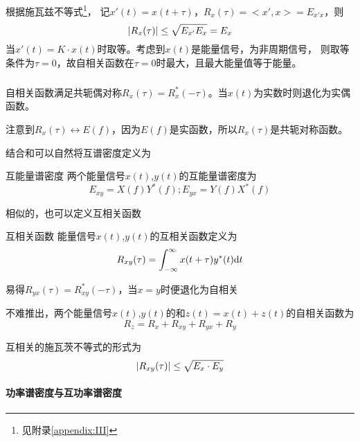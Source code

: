     \Proof
    根据施瓦兹不等式\footnote{见\textcolor{bupt}{附录}\ref{appendix:III}}，
    记$x'(t)=x(t+\tau)$，$R_x(\tau)=<x',x>=E_{x'x}$，则
    \begin{equation}
            \left\vert R_x(\tau) \right\vert\leq \sqrt{E_{x'}E_x}=E_x
    \end{equation}
    当$x'(t)=K\cdot x(t)$时取等。考虑到$x(t)$是能量信号，为非周期信号，
    则取等条件为$\tau=0$，故自相关函数在$\tau =0$时最大，且最大能量值等于能量。
    \subparagraph{\hspace{-1em}}自相关函数满足共轭偶对称$R_x(\tau)=R^*_x(-\tau)$。当$x(t)$为实数时则退化为实偶函数。
    
    \Proof 注意到$R_x(\tau)\leftrightarrow E(f)$，因为$E(f)$是实函数，所以$R_x(\tau)$是共轭对称函数。

    结合和可以自然将互谱密度定义为
    \begin{mydef}{互能量谱密度}
        两个能量信号$x(t)$,$y(t)$的互能量谱密度为
        \begin{equation}
            E_{xy}=X(f)Y^*(f);E_{yx}=Y(f)X^*(f)
        \end{equation}
    \end{mydef}
    相似的，也可以定义互相关函数
    \begin{mydef}{互相关函数}
        能量信号$x(t)$,$y(t)$的互相关函数定义为
        \begin{equation}
            R_{xy}(\tau)=\int_{-\infty}^{\infty}x(t+\tau)y^*(t)\text{\upshape d} t
        \end{equation}
    \end{mydef}
    易得$R_{yx}(\tau)=R_{xy}^*(-\tau)$，当$x=y$时便退化为自相关

    不难推出，两个能量信号$x(t)$,$y(t)$的和$z(t)=x(t)+z(t)$的自相关函数为
    \begin{equation}
        R_z=R_x+R_{xy}+R_{yx}+R_y
    \end{equation}
    
    互相关的施瓦茨不等式的形式为
    \begin{equation}
        \left\vert R_{xy}(\tau) \right\vert\leq\sqrt{E_x\cdot E_y}
    \end{equation}
    \newpage%
    \paragraph{功率谱密度与互功率谱密度}\mbox{}

